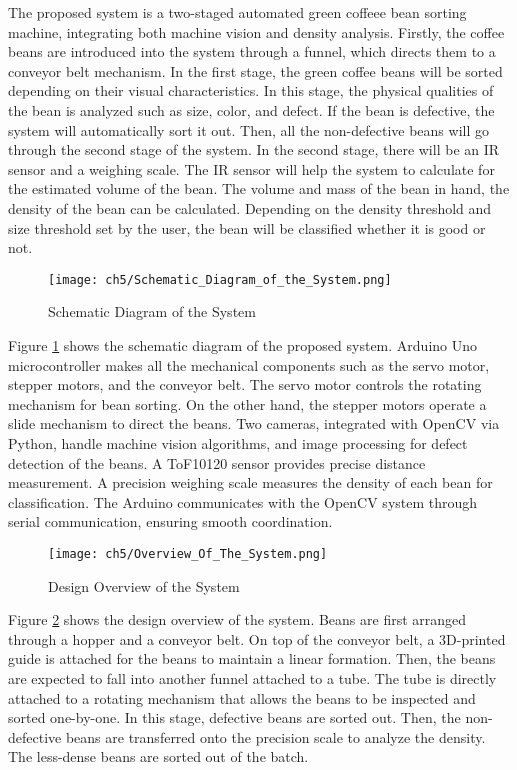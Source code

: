 The proposed system is a two-staged automated green coffeee bean sorting machine, integrating both machine vision and density analysis. Firstly, the coffee beans are introduced into the system through a funnel, which directs them to a conveyor belt mechanism.  In the first stage, the green coffee beans will be sorted depending on their visual characteristics. In this stage, the physical qualities of the bean is analyzed such as size, color, and defect. If the bean is defective, the system will automatically sort it out. Then, all the non-defective beans will go through the second stage of the system. In the second stage, there will be an IR sensor and a weighing scale. The IR sensor will help the system to calculate for the estimated volume of the bean. The volume and mass of the bean in hand, the density of the bean can be calculated. Depending on the density threshold and size threshold set by the user, the bean will be classified whether it is good or not.

\begin{figure}[h]
    \centering
    \texttt{[image: ch5/Schematic\_Diagram\_of\_the\_System.png]}
    \caption{Schematic Diagram of the System}
    \label{fig:system_schematic_diagram}
\end{figure}

Figure \ref{fig:system_schematic_diagram} shows the schematic diagram of the proposed system. Arduino Uno microcontroller makes all the mechanical components such as the servo motor, stepper motors, and the conveyor belt. The servo motor controls the  rotating mechanism for bean sorting. On the other hand, the stepper motors operate a slide mechanism to direct the beans. Two cameras, integrated with OpenCV via Python, handle machine vision algorithms, and image processing for defect detection of the beans. A ToF10120 sensor provides precise distance measurement. A precision weighing scale measures the density of each bean for classification. The Arduino communicates with the OpenCV system through serial communication, ensuring smooth coordination.

\begin{figure}[h]
    \centering
    \texttt{[image: ch5/Overview\_Of\_The\_System.png]}
    \caption{Design Overview of the System}
    \label{fig:system_design_overview}
\end{figure}

Figure \ref{fig:system_design_overview} shows the design overview of the system. Beans are first arranged through a hopper and a conveyor belt. On top of the conveyor belt, a 3D-printed guide is attached for the beans to maintain a linear formation. Then, the beans are expected to fall into another funnel attached to a tube. The tube is directly attached to a rotating mechanism that allows the beans to be inspected and sorted one-by-one. In this stage, defective beans are sorted out. Then, the non-defective beans are transferred onto the precision scale to analyze the density. The less-dense beans are sorted out of the batch.

